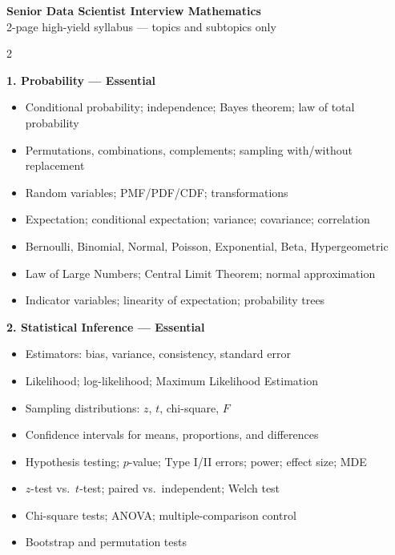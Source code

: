 \documentclass[9pt,a4paper]{article}
\newcommand{\topic}[1]{%
    \vspace{2.2mm}
    {\large\bfseries #1}\par
    \vspace{0.5mm}
}
\begin{document}
\begin{center}
    {\LARGE\bfseries Senior Data Scientist Interview Mathematics}\\[1mm]
    {\small 2-page high-yield syllabus --- topics and subtopics only}
\end{center}

\vspace{1mm}

\begin{multicols}{2}

\topic{1. Probability --- Essential}
\begin{itemize}
    \item Conditional probability; independence; Bayes theorem; law of total probability
    \item Permutations, combinations, complements; sampling with/without replacement
    \item Random variables; PMF/PDF/CDF; transformations
    \item Expectation; conditional expectation; variance; covariance; correlation
    \item Bernoulli, Binomial, Normal, Poisson, Exponential, Beta, Hypergeometric
    \item Law of Large Numbers; Central Limit Theorem; normal approximation
    \item Indicator variables; linearity of expectation; probability trees
\end{itemize}

\topic{2. Statistical Inference --- Essential}
\begin{itemize}
    \item Estimators: bias, variance, consistency, standard error
    \item Likelihood; log-likelihood; Maximum Likelihood Estimation
    \item Sampling distributions: $z$, $t$, chi-square, $F$
    \item Confidence intervals for means, proportions, and differences
    \item Hypothesis testing; $p$-value; Type I/II errors; power; effect size; MDE
    \item $z$-test vs.\ $t$-test; paired vs.\ independent; Welch test
    \item Chi-square tests; ANOVA; multiple-comparison control
    \item Bootstrap and permutation tests
\end{itemize}


\end{multicols}
\end{document}
